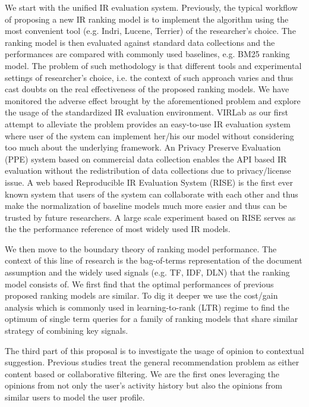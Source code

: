 We start with the unified IR evaluation system. Previously, the typical 
workflow of proposing a new IR ranking model is to implement the algorithm 
using the most convenient tool (e.g. Indri, Lucene, Terrier) of the 
researcher's choice. The ranking model is then evaluated against standard 
data collections and the performances are compared with commonly used 
baselines, e.g. BM25 ranking model. The problem of such methodology is that 
different tools and experimental settings of researcher's choice, i.e. the 
context of such approach varies and thus cast doubts on the real effectiveness 
of the proposed ranking models. 
We have monitored the adverse effect brought by the aforementioned problem and 
explore the usage of the standardized IR evaluation environment. 
VIRLab as our first attempt to alleviate the problem provides an easy-to-use 
IR evaluation system where user of the system can implement her/his our model 
without considering too much about the underlying framework. 
An Privacy Preserve Evaluation (PPE) system based on commercial data 
collection enables the API based IR evaluation without the redistribution 
of data collections due to privacy/license issue.
A web based Reproducible IR Evaluation System (RISE) is the first ever known 
system that users of the system can collaborate with each other and thus make 
the normalization of baseline models much more easier and thus can be trusted 
by future researchers. A large scale experiment based on RISE serves as the 
the performance reference of most widely used IR models.

We then move to the boundary theory of ranking model performance. 
The context of this line of research is the bag-of-terms representation of 
the document assumption and the widely used signals (e.g. TF, IDF, DLN) that 
the ranking model consists of. We first find that the optimal performances of 
previous proposed ranking models are similar. To dig it deeper we use the 
cost/gain analysis which is commonly used in learning-to-rank (LTR) regime 
to find the optimum of single term queries for a family of ranking models that 
share similar strategy of combining key signals. 

The third part of this proposal is to investigate the usage of opinion to 
contextual suggestion. Previous studies treat the general recommendation 
problem as either content based or collaborative filtering. We are the first 
ones leveraging the opinions from not only the user's activity history but 
also the opinions from similar users to model the user profile. 















